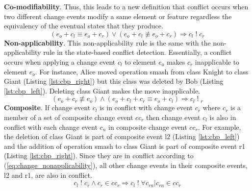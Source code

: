 \textbf{Co-modifiability}. Thus, this leads to a new definition that conflict occurs when two different change events modify a same element or feature regardless the equivalency of the eventual states that they produce. 
\begin{equation} \label{eq:change_comodifiabilty}
(e_{o} + c_{l} \equiv e_{o} + c_{r}) \vee (e_{o} + c_{l} \not\equiv e_{o} + c_{r}) \Rightarrow c_{l}\;!\;c_{r}
\end{equation} 
\textbf{Non-applicability}. This non-applicability rule is the same with the non-applicability rule in the state-based conflict detection. Essentially, a conflict occurs when applying a change event $c_{l}$ to element $e_{o}$ makes $c_{r}$ inapplicable to element $e_{o}$. For instance, Alice moved operation \textsf{smash} from class \textsf{Knight} to class \textsf{Giant} (Listing \ref{lst:cbp_right}) but this class was deleted by Bob (Listing \ref{lst:cbp_left}). Deleting class \textsf{Giant} makes the move inapplicable. 
\begin{equation} \label{eq:change_nonapplicability}
(e_{o} + c_{r} \not\equiv e_{o}) \wedge (e_{o} + c_{l} + c_{r} \equiv e_{o} + c_{l}) \Rightarrow c_{l}\;!\;_{r}
\end{equation}
\textbf{Composite}. If change event $c_{l}$ is in conflict with change event $c_{r}$ where $c_{r}$ is a member of a set of composite change event $cc_{r}$ then change event $c_{l}$ is also in conflict with each change event $c_{n}$ in composite change event $cc_{r}$. For example, the deletion of class \textsf{Giant} is part of composite event \textsf{l2} (Listing \ref{lst:cbp_left}) and the addition of operation \textsf{smash} to class \textsf{Giant} is part of composite event \textsf{r1} (Listing \ref{lst:cbp_right}). Since they are in conflict according to (\ref{eq:change_nonapplicability}), all other change events in their composite events, \textsf{l2} and \textsf{r1}, are also in conflict.
\begin{equation} \label{eq:change_composite}
c_{l}\;!\;c_{r} \wedge c_{r} \in cc_{r} \Rightarrow c_{l}\;!\; \forall c_{rn} | c_{rn} \in cc_{r}
\end{equation}


